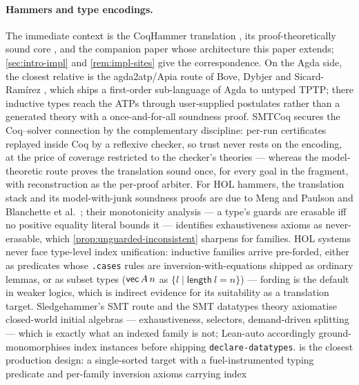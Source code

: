 \paragraph{Hammers and type encodings.}  The immediate context is the
CoqHammer translation \cite{CzajkaKaliszyk2018,CzajkaKaliszyk2016}, its
proof-theoretically sound core \cite{Czajka2018}, and the companion
paper \cite{Extraction2026} whose architecture this paper extends;
\cref{sec:intro-impl} and \cref{rem:impl-sites} give the
correspondence.  On the Agda side, the closest relative is the
agda2atp/Apia route of Bove, Dybjer and Sicard-Ram{\'i}rez
\cite{BoveEtAl2012}, which ships a first-order sub-language of Agda to
untyped TPTP; there inductive types reach the ATPs through
user-supplied postulates rather than a generated theory with a
once-and-for-all soundness proof.  SMTCoq
\cite{ArmandEtAl2011,EkiciEtAl2017} secures the Coq--solver connection
by the complementary discipline: per-run certificates replayed inside
Coq by a reflexive checker, so trust never rests on the encoding, at
the price of coverage restricted to the checker's theories --- whereas
the model-theoretic route proves the translation sound once, for every
goal in the fragment, with reconstruction as the per-proof arbiter.
For HOL hammers, the translation stack and its
model-with-junk soundness proofs are due to Meng and Paulson
\cite{MengPaulson2008} and Blanchette et al.\
\cite{BlanchetteEtAl2016}; their monotonicity analysis --- a type's
guards are erasable iff no positive equality literal bounds it ---
identifies exhaustiveness axioms as never-erasable, which
\cref{prop:unguarded-inconsistent} sharpens for families.  HOL systems
never face type-level index unification: inductive families arrive
pre-forded, either as predicates whose \texttt{.cases} rules are
inversion-with-equations shipped as ordinary lemmas, or as subset types
($\mathsf{vec}\,A\,n$ as $\{l \mid \mathsf{length}\ l = n\}$) --- fording is
the default in weaker logics, which is indirect evidence for its
suitability as a translation target.  Sledgehammer's SMT route
\cite{BlanchetteEtAl2013} and the SMT datatypes theory
\cite{BarrettEtAl2007,ReynoldsBlanchette2017} axiomatise closed-world
initial algebras --- exhaustiveness, selectors, demand-driven splitting
--- which is exactly what an indexed family is not; Lean-auto
\cite{QianEtAl2025} accordingly ground-monomorphises index instances
before shipping \texttt{declare-datatypes}.  \fstar{} \cite{SwamyEtAl2016} is the closest
production design: a single-sorted target with a fuel-instrumented
typing predicate and per-family inversion axioms carrying index
